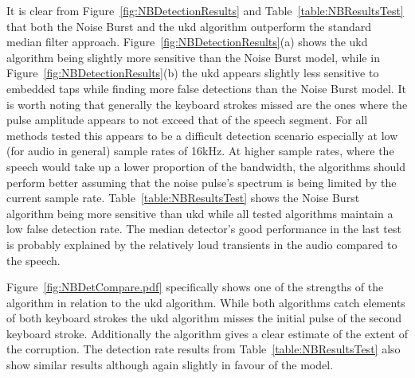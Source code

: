 \DIFaddbegin \label{corrections:discuss_discrep}
\DIFaddend It is clear from Figure~\ref{fig:NBDetectionResults} and Table~\ref{table:NBResultsTest} that both the Noise Burst and the \DIFdelbegin {}\DIFdelend \DIFaddbegin \gls{ukd} \DIFaddend algorithm outperform the standard median filter approach. Figure~\ref{fig:NBDetectionResults}(a) shows the \DIFdelbegin {}\DIFdelend \DIFaddbegin \gls{ukd} \DIFaddend algorithm being slightly more sensitive than the Noise Burst model, while in Figure~\ref{fig:NBDetectionResults}(b) the \DIFdelbegin {}\DIFdelend \DIFaddbegin \gls{ukd} \DIFaddend appears slightly less sensitive to embedded taps while finding more false detections than the Noise Burst model. It is worth noting that generally the keyboard strokes missed are the ones where the pulse amplitude appears to not exceed that of the speech segment. For all methods tested this appears to be a difficult detection scenario especially at low (for audio in general) sample rates of 16kHz. At higher sample rates, where the speech would take up a lower proportion of the bandwidth, the algorithms should perform better assuming that the noise pulse's spectrum is being limited by the current sample rate. Table~\ref{table:NBResultsTest} shows the Noise Burst algorithm being more sensitive than \DIFdelbegin {}\DIFdelend \DIFaddbegin \gls{ukd} \DIFaddend while all tested algorithms maintain a low false detection rate. The median detector's good performance in the last test is probably explained by the relatively loud transients in the audio compared to the speech.

Figure~\ref{fig:NBDetCompare.pdf} specifically shows one of the strengths of the \DIFdelbegin {}\DIFdelend \DIFaddbegin {}\DIFaddend algorithm in relation to the \DIFdelbegin {}\DIFdelend \DIFaddbegin \gls{ukd} \DIFaddend algorithm. While both algorithms catch elements of both keyboard strokes the \DIFdelbegin {}\DIFdelend \DIFaddbegin \gls{ukd} \DIFaddend algorithm misses the initial pulse of the second keyboard stroke. Additionally the \DIFdelbegin {}\DIFdelend \DIFaddbegin {}\DIFaddend algorithm gives a clear estimate of the extent of the corruption. The detection rate results from Table~\ref{table:NBResultsTest} also show similar results although again slightly in favour of the \DIFdelbegin {}\DIFdelend \DIFaddbegin {}\DIFaddend model.

